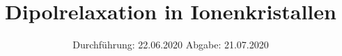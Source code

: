 

\subject{Nr. 48}
\title{Dipolrelaxation in Ionenkristallen}
\date{%
  Durchführung: 22.06.2020
  \hspace{3em}
  Abgabe: 21.07.2020
}



\maketitle
\thispagestyle{empty}
\tableofcontents
\newpage






\printbibliography{}



